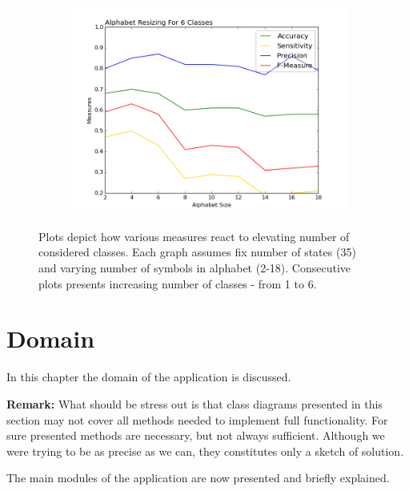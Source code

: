 \documentclass{mini}
\begin{document}
\begin{figure}
\begin{subfigure}{.5\textwidth}
  \label{fig:sfig1}
\end{subfigure}%
\begin{subfigure}{.5\textwidth}
  \centering
  \includegraphics[width=1\linewidth]{images/a_c6_fig.png}
  \label{fig:sfig2}
\end{subfigure}
\caption{Plots depict how various measures react to elevating number of considered classes. Each graph assumes fix number of states (35) and varying number of symbols in alphabet (2-18). Consecutive plots presents increasing number of classes - from 1 to 6.}
\label{fig:fig}
\end{figure}


\chapter{Domain} \label{chap:domain}
In this chapter the domain of the application is discussed. 

\textbf{Remark:} What should be stress out is that class diagrams presented in this section may not cover all methods needed to implement full functionality. For sure presented methods are necessary, but not always sufficient. Although we were trying to be as precise as we can, they constitutes only a sketch of solution.

The main modules of the application are now presented and briefly explained.
\end{document}

